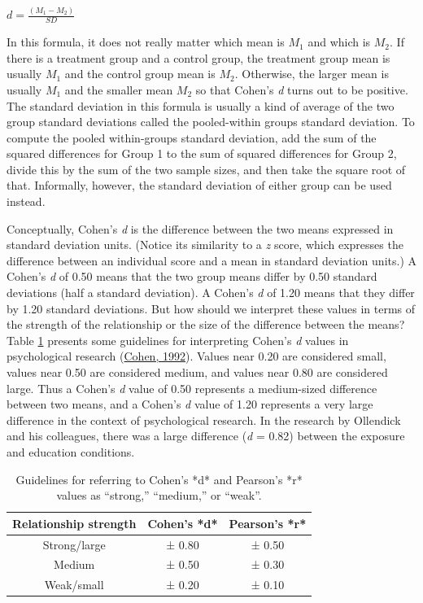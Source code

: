 \documentclass[
]{krantz}
\begin{document}
\(d=\frac{(M_1-M_2)}{SD}\)

In this formula, it does not really matter which mean is \(M_1\) and which is \(M_2\). If there is a treatment group and a control group, the treatment group mean is usually \(M_1\) and the control group mean is \(M_2\). Otherwise, the larger mean is usually \(M_1\) and the smaller mean \(M_2\) so that Cohen's \emph{d} turns out to be positive. The standard deviation in this formula is usually a kind of average of the two group standard deviations called the pooled-within groups standard deviation. To compute the pooled within-groups standard deviation, add the sum of the squared differences for Group 1 to the sum of squared differences for Group 2, divide this by the sum of the two sample sizes, and then take the square root of that. Informally, however, the standard deviation of either group can be used instead.

Conceptually, Cohen's \emph{d} is the difference between the two means expressed in standard deviation units. (Notice its similarity to a \emph{z} score, which expresses the difference between an individual score and a mean in standard deviation units.) A Cohen's \emph{d} of 0.50 means that the two group means differ by 0.50 standard deviations (half a standard deviation). A Cohen's \emph{d} of 1.20 means that they differ by 1.20 standard deviations. But how should we interpret these values in terms of the strength of the relationship or the size of the difference between the means? Table \ref{tab:guidelines} presents some guidelines for interpreting Cohen's \emph{d} values in psychological research (\protect\hyperlink{ref-cohen1992power}{Cohen, 1992}). Values near 0.20 are considered small, values near 0.50 are considered medium, and values near 0.80 are considered large. Thus a Cohen's \emph{d} value of 0.50 represents a medium-sized difference between two means, and a Cohen's \emph{d} value of 1.20 represents a very large difference in the context of psychological research. In the research by Ollendick and his colleagues, there was a large difference (\emph{d} = 0.82) between the exposure and education conditions.

\begin{table}

\caption{\label{tab:guidelines}Guidelines for referring to Cohen’s *d* and Pearson’s *r* values as “strong,” “medium,” or “weak”.}
\centering
\begin{tabular}[t]{c|c|c}
\hline
Relationship strength & Cohen's *d* & Pearson's *r*\\
\hline
Strong/large & ± 0.80 & ± 0.50\\
\hline
Medium & ± 0.50 & ± 0.30\\
\hline
Weak/small & ± 0.20 & ± 0.10\\
\hline
\end{tabular}
\end{table}
\end{document}
